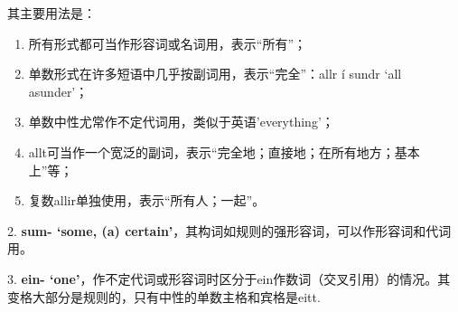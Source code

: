其主要用法是：

\begin{enumerate}
  \def\labelenumi{\Alph{enumi}.}
  \item
        所有形式都可当作形容词或名词用，表示``所有''；
  \item
        单数形式在许多短语中几乎按副词用，表示``完全''：allr í sundr `all
        asunder'；
  \item
        单数中性尤常作不定代词用，类似于英语'everything'；
  \item
        allt可当作一个宽泛的副词，表示``完全地；直接地；在所有地方；基本上''等；
  \item
        复数allir单独使用，表示``所有人；一起''。
\end{enumerate}

2. \textbf{sum- `some, (a)
  certain‌'}，其构词如规则的强形容词，可以作形容词和代词用。

3. \textbf{ein-
  `one‌'}，作不定代词或形容词时区分于ein作数词（交叉引用）的情况。其变格大部分是规则的，只有中性的单数主格和宾格是eitt.


